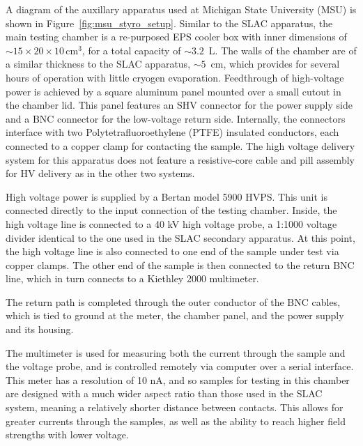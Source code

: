 \documentclass[a4paper,12pt]{article}
\begin{document}
A diagram of the auxillary apparatus used at Michigan State University (MSU) is shown in Figure~\ref{fig:msu_styro_setup}.  Similar to the SLAC apparatus, the main testing chamber is a re-purposed EPS cooler box with inner dimensions of $\sim 15 \times 20 \times 10\,$cm$^3$, for a total capacity of $\sim 3.2\,$ L.  The walls of the chamber are of a similar thickness to the SLAC apparatus, $\sim 5\,$ cm, which provides for several hours of operation with little cryogen evaporation.  Feedthrough of high-voltage power is achieved by a square aluminum panel mounted over a small cutout in the chamber lid.  This panel features an SHV connector for the power supply side and a BNC connector for the low-voltage return side.  Internally, the connectors interface with two Polytetrafluoroethylene (PTFE) insulated conductors, each connected to a copper clamp for contacting the sample.  The high voltage delivery system for this apparatus does not feature a resistive-core cable and pill assembly for HV delivery as in the other two systems.

High voltage power is supplied by a Bertan model 5900 HVPS.  This unit is connected directly to the input connection of the testing chamber.  Inside, the high voltage line is connected to a 40 kV high voltage probe, a 1:1000 voltage divider identical to the one used in the SLAC secondary apparatus.  At this point, the high voltage line is also connected to one end of the sample under test via copper clamps.  The other end of the sample is then connected to the return BNC line, which in turn connects to a Kiethley 2000 multimeter.

The return path is completed through the outer conductor of the BNC cables, which is tied to ground at the meter, the chamber panel, and the power supply and its housing.

The multimeter is used for measuring both the current through the sample and the voltage probe, and is controlled remotely via computer over a serial interface.  This meter has a resolution of 10 nA, and so samples for testing in this chamber are designed with a much wider aspect ratio than those used in the SLAC system, meaning a relatively shorter distance between contacts.  This allows for greater currents through the samples, as well as the ability to reach higher field strengths with lower voltage.
\end{document}
